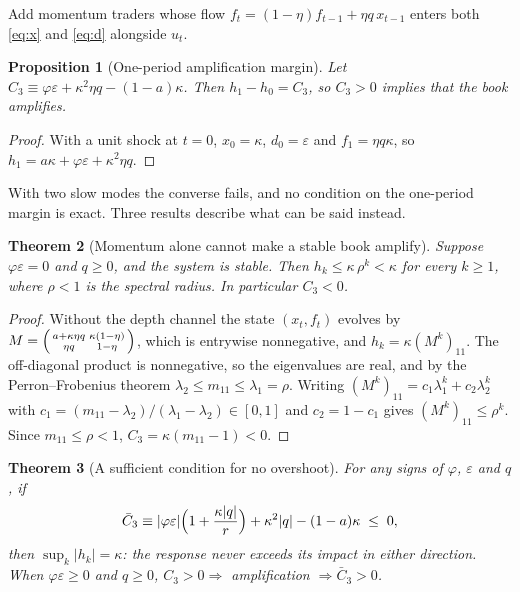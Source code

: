\documentclass[12pt]{article}
\newtheorem{theorem}{Theorem}[section]
\newtheorem{proposition}[theorem]{Proposition}
\theoremstyle{definition}
\theoremstyle{remark}
\begin{document}
Add momentum traders whose flow $f_t=(1-\eta)f_{t-1}+\eta q\,x_{t-1}$ enters both \eqref{eq:x} and \eqref{eq:d} alongside $u_t$.

\begin{proposition}[One-period amplification margin]\label{prop:t6m}
Let $C_3\equiv\varphi\varepsilon+\kappa^2\eta q-(1-a)\kappa$. Then $h_1-h_0=C_3$, so $C_3>0$ implies that the book amplifies.
\end{proposition}

\begin{proof}
With a unit shock at $t=0$, $x_0=\kappa$, $d_0=\varepsilon$ and $f_1=\eta q\kappa$, so $h_1=a\kappa+\varphi\varepsilon+\kappa^2\eta q$.
\end{proof}

With two slow modes the converse fails, and no condition on the one-period margin is exact. Three results describe what can be said instead.

\begin{theorem}[Momentum alone cannot make a stable book amplify]\label{thm:nomom}
Suppose $\varphi\varepsilon=0$ and $q\ge0$, and the system is stable. Then $h_k\le\kappa\,\rho^k<\kappa$ for every $k\ge1$, where $\rho<1$ is the spectral radius. In particular $C_3<0$.
\end{theorem}

\begin{proof}
Without the depth channel the state $(x_t,f_t)$ evolves by $M=\begin{psmallmatrix}a+\kappa\eta q&\kappa(1-\eta)\\ \eta q&1-\eta\end{psmallmatrix}$, which is entrywise nonnegative, and $h_k=\kappa(M^k)_{11}$. The off-diagonal product is nonnegative, so the eigenvalues are real, and by the Perron--Frobenius theorem $\lambda_2\le m_{11}\le\lambda_1=\rho$. Writing $(M^k)_{11}=c_1\lambda_1^k+c_2\lambda_2^k$ with $c_1=(m_{11}-\lambda_2)/(\lambda_1-\lambda_2)\in[0,1]$ and $c_2=1-c_1$ gives $(M^k)_{11}\le\rho^k$. Since $m_{11}\le\rho<1$, $C_3=\kappa(m_{11}-1)<0$.
\end{proof}

\begin{theorem}[A sufficient condition for no overshoot]\label{thm:noover}
For any signs of $\varphi$, $\varepsilon$ and $q$, if
\[
\bar C_3\equiv|\varphi\varepsilon|\Bigl(1+\frac{\kappa|q|}{r}\Bigr)+\kappa^2|q|-(1-a)\kappa\;\le\;0,
\]
then $\sup_k|h_k|=\kappa$: the response never exceeds its impact in either direction. When $\varphi\varepsilon\ge0$ and $q\ge0$, $C_3>0\Rightarrow$ amplification $\Rightarrow\bar C_3>0$.
\end{theorem}
\end{document}
